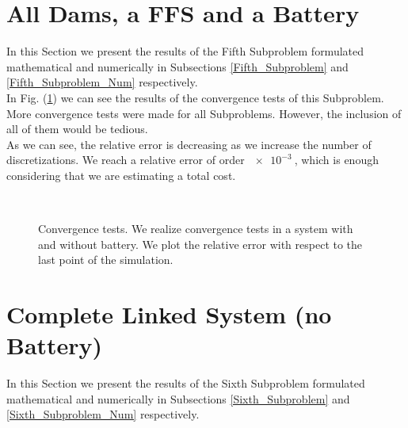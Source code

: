 \section{All Dams, a FFS and a Battery} \label{Fifth_Subproblem_Results}

In this Section we present the results of the Fifth Subproblem formulated mathematical and numerically in Subsections \ref{Fifth_Subproblem} and \ref{Fifth_Subproblem_Num} respectively.\\

In Fig. (\ref{Plot_SP5_1}) we can see the results of the convergence tests of this Subproblem. More convergence tests were made for all Subproblems. However, the inclusion of all of them would be tedious.\\
As we can see, the relative error is decreasing as we increase the number of discretizations. We reach a relative error of order $\SI{e-3}{}$, which is enough considering that we are estimating a total cost.

\begin{figure}[H]
\centering
{}\\
\quad
{}
\caption{Convergence tests. We realize convergence tests in a system with and without battery. We plot the relative error with respect to the last point of the simulation.}
\label{Plot_SP5_1}
\end{figure}

\section{Complete Linked System (no Battery)} \label{Sixth_Subproblem_Results}

In this Section we present the results of the Sixth Subproblem formulated mathematical and numerically in Subsections \ref{Sixth_Subproblem} and \ref{Sixth_Subproblem_Num} respectively.\\

